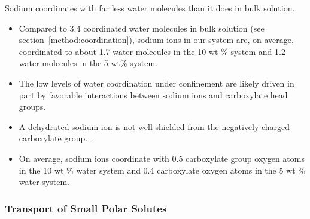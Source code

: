 \documentclass{article}
\begin{document}
  \noindent Sodium coordinates with far less water molecules than it does in 
  bulk solution.
  \begin{itemize}
    \item Compared to 3.4 coordinated water molecules in bulk solution (see 
    section~\ref{method:coordination}), sodium ions in our system are, on average,
    coordinated to about 1.7 water molecules in the 10 wt \% system and 1.2 water
    molecules in the 5 wt\% system.
    \item The low levels of water coordination under confinement are likely driven
    in part by favorable interactions between sodium ions and carboxylate head groups.
    \item A dehydrated sodium ion is not well shielded from the negatively charged 
    carboxylate group.~\cite{ma_drastically_2019}. 
    \item On average, sodium ions coordinate with 0.5 carboxylate group oxygen atoms in the
    10 wt \% water system and 0.4 carboxylate oxygen atoms in the 5 wt \% water system. 
  \end{itemize}
  
  
  \subsubsection*{Transport of Small Polar Solutes}\label{section:general_transport_solutes}  
  
\end{document}
